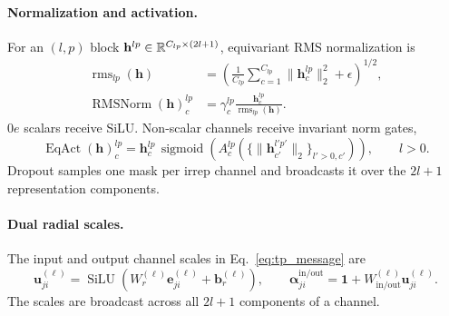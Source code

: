 \paragraph{Normalization and activation.}
For an \((l,p)\) block
\(\mathbf{h}^{lp}\in\mathbb{R}^{C_{lp}\times(2l+1)}\), equivariant RMS
normalization is
\begin{align}
    \operatorname{rms}_{lp}(\mathbf{h})
    &=
    \left(
      \frac{1}{C_{lp}}
      \sum_{c=1}^{C_{lp}}\|\mathbf{h}^{lp}_c\|_2^2+\epsilon
    \right)^{1/2},\\
    \operatorname{RMSNorm}(\mathbf{h})^{lp}_c
    &=
    \gamma^{lp}_c
    \frac{\mathbf{h}^{lp}_c}{\operatorname{rms}_{lp}(\mathbf{h})}.
    \label{eq:irrep_rmsnorm}
\end{align}
\(0e\) scalars receive SiLU. Non-scalar channels receive invariant norm gates,
\begin{equation}
    \operatorname{EqAct}(\mathbf{h})^{lp}_c
    =
    \mathbf{h}^{lp}_c\,
    \operatorname{sigmoid}
    \left(
      A^{lp}_c(
      \{\|\mathbf{h}^{l'p'}_{c'}\|_2\}_{l'>0,c'})
    \right),
    \qquad l>0.
    \label{eq:equivariant_activation}
\end{equation}
Dropout samples one mask per irrep channel and broadcasts it over the
\(2l+1\) representation components.

\paragraph{Dual radial scales.}
The input and output channel scales in Eq.~\eqref{eq:tp_message} are
\begin{equation}
    \mathbf{u}_{ji}^{(\ell)}
    =
    \operatorname{SiLU}
    (W_r^{(\ell)}\mathbf{e}_{ji}^{(\ell)}+\mathbf{b}_r^{(\ell)}),
    \qquad
    \boldsymbol{\alpha}_{ji}^{\mathrm{in/out}}
    =
    \mathbf{1}
    +W_{\mathrm{in/out}}^{(\ell)}
    \mathbf{u}_{ji}^{(\ell)}.
    \label{eq:dual_radial}
\end{equation}
The scales are broadcast across all \(2l+1\) components of a channel.

